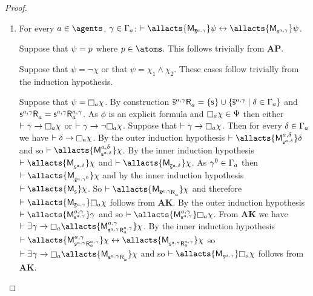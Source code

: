 \begin{proof}
\begin{enumerate}
    \item For every $\agentA \in \agents$, $\gamma \in \Gamma_a$: $\proves \allacts{\aPModel{\aPStateS[\agentA,\gamma]}} \psi \iff \allacts{\aPModel{\aStateS[\agentA,\gamma]}} \psi$.

        Suppose that $\psi = p$ where $\atomP \in \atoms$. 
        This follows trivially from {\bf AP}.

        Suppose that $\psi = \neg \chi$ or that $\psi = \chi_1 \land \chi_2$. These cases follow trivially from the induction hypothesis.

        Suppose that $\psi = \necessaryA \chi$.
        By construction $\aPStateS[\agentA,\gamma] \aAccessibility{\agentA} = \{\aStateS\} \cup \{\aPStateS[\agentA,\gamma] \mid \delta \in \Gamma_\agentA\}$ and $\aStateS[\agentA,\gamma] \aAccessibility{\agentA} = \aStateS[\agentA,\gamma] \aAccessibility[\agentA,\gamma]{\agentA}$.
        As $\phi$ is an explicit formula and $\necessaryA \chi \in \Psi$ then either $\proves \gamma \implies \necessaryA \chi$ or $\proves \gamma \implies \neg \necessaryA \chi$.
        Suppose that $\proves \gamma \implies \necessaryA \chi$.
        Then for every $\delta \in \Gamma_a$ we have $\proves \delta \implies \necessaryA \chi$.
        By the outer induction hypothesis $\proves \allacts{\aPModel[\agentA,\delta]{\aStateS[\agentA,\delta]}} \delta$ and so $\proves \allacts{\aPModel[\agentA,\delta]{\aStateS[\agentA,\delta]}} \chi$.
        By the inner induction hypothesis $\proves \allacts{\aPModel{\aStateS[\agentA,\delta]}} \chi$ and $\proves \allacts{\aPModel{\aPStateS[\agentA,\delta]}} \chi$.
        As $\gamma^0 \in \Gamma_a$ then $\proves \allacts{\aPModel{\aPStateS[\agentA,\gamma^0]}} \chi$ and by the inner induction hypothesis $\proves \allacts{\aPModel{\aStateS}} \chi$.
        So $\proves \allacts{\aPModel{\aPStateS[\agentA,\gamma] \aAccessibility{\agentA}}} \chi$ and therefore $\proves \allacts{\aPModel{\aPStateS[\agentA,\gamma]}} \necessaryA \chi$ follows from {\bf AK}.
        By the outer induction hypothesis $\proves \allacts{\aPModel[\agentA,\gamma]{\aStateS[\agentA,\gamma]}} \gamma$ and so $\proves \allacts{\aPModel[\agentA,\gamma]{\aStateS[\agentA,\gamma]}} \necessaryA \chi$.
        From {\bf AK} we have $\proves \somerefs \gamma \implies \necessaryA \allacts{\aPModel[\agentA,\gamma]{\aStateS[\agentA,\gamma] \aAccessibility[\agentA,\gamma]{\agentA}}} \chi$.
        By the inner induction hypothesis $\proves \allacts{\aPModel[\agentA,\gamma]{\aStateS[\agentA,\gamma] \aAccessibility[\agentA,\gamma]{\agentA}}} \chi \iff \allacts{\aPModel{\aStateS[\agentA,\gamma] \aAccessibility[\agentA,\gamma]{\agentA}}} \chi$ so $\proves \somerefs \gamma \implies \necessaryA \allacts{\aPModel{\aStateS[\agentA,\gamma] \aAccessibility{\agentA}}} \chi$ and so $\proves \allacts{\aPModel{\aStateS[\agentA,\gamma]}} \necessaryA \chi$ follows from {\bf AK}.


\end{enumerate}
\end{proof}

